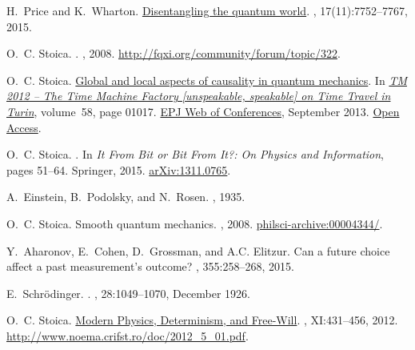 \documentclass[12pt]{amsart}
\theoremstyle{definition}
\theoremstyle{plain}
\begin{document}
\begin{thebibliography}{10}
H.~Price and K.~Wharton.
\newblock \href{http://www.mdpi.com/1099-4300/17/11/7752/htm}{Disentangling the
  quantum world}.
, 17(11):7752--7767, 2015.

O.~C. {Stoica}.
.
, 2008.
\newblock
  \href{http://fqxi.org/community/forum/topic/322}{http://fqxi.org/community/forum/topic/322}.

O.~C. Stoica.
\newblock \href{http://dx.doi.org/10.1051/epjconf/20135801017}{Global and local
  aspects of causality in quantum mechanics}.
\newblock In {\em \href{http://timemachine.polito.it/home/?q=node/2}{TM 2012 --
  The Time Machine Factory [unspeakable, speakable] on Time Travel in Turin}},
  volume~58, page 01017.
  \href{http://www.epj-conferences.org/index.php?option=com_toc&url=/articles/epjconf/abs/2013/19/contents/contents.html}{EPJ
  Web of Conferences}, September 2013.
\newblock \href{http://dx.doi.org/10.1051/epjconf/20135801017}{Open Access}.

O.~C. Stoica.
.
\newblock In {\em {It From Bit or Bit From It?: On Physics and Information}},
  pages 51--64. Springer, 2015.
\newblock \href{http://arxiv.org/abs/1311.0765}{arXiv:1311.0765}.

A.~Einstein, B.~Podolsky, and N.~Rosen.
, 1935.

O.~C. {Stoica}.
\newblock Smooth quantum mechanics.
, 2008.
\newblock
  \href{http://philsci-archive.pitt.edu/archive/00004344/}{philsci-archive:00004344/}.

Y.~Aharonov, E.~Cohen, D.~Grossman, and A.C. Elitzur.
\newblock Can a future choice affect a past measurement’s outcome?
, 355:258--268, 2015.

E.~Schr\"odinger.
.
, 28:1049--1070, December 1926.

O.~C. Stoica.
\newblock \href{http://www.noema.crifst.ro/doc/2012_5_01.pdf}{Modern Physics,
  Determinism, and Free-Will}.
, XI:431--456, 2012.
\newblock
  \href{http://www.noema.crifst.ro/doc/2012_5_01.pdf}{http://www.noema.crifst.ro/doc/2012\_5\_01.pdf}.


\end{thebibliography}
\end{document}
